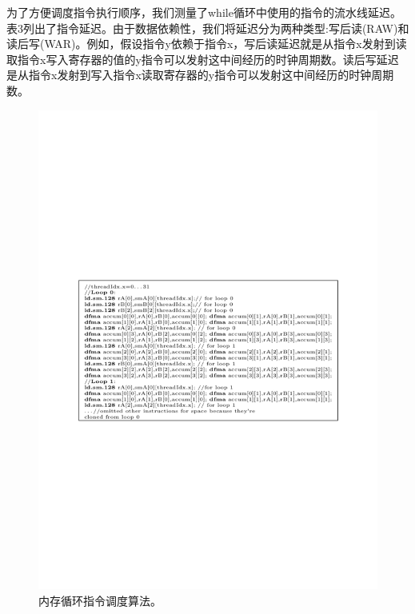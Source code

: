 \begin{flushleft}
为了方便调度指令执行顺序，我们测量了while循环中使用的指令的流水线延迟。表3列出了指令延迟。由于数据依赖性，我们将延迟分为两种类型:写后读(RAW)和读后写(WAR)。例如，假设指令y依赖于指令x，写后读延迟就是从指令x发射到读取指令x写入寄存器的值的y指令可以发射这中间经历的时钟周期数。读后写延迟是从指令x发射到写入指令x读取寄存器的y指令可以发射这中间经历的时钟周期数。

\begin{figure}[htbp]
	\begin{center}
		\includegraphics[scale=0.8]{Img/Chap_Algorithm/InstrSched}
		\caption{内存循环指令调度算法。} \label{fig:InstrSched}
	\end{center}
\end{figure}


\end{flushleft}
